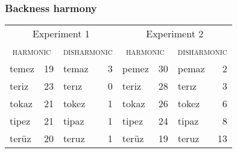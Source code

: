 





\subsubsection{Backness harmony}

\begin{example}
\begin{tabular}{lrlr|lrlr}
\toprule
\multicolumn{4}{c|}{Experiment 1} & \multicolumn{4}{c}{Experiment 2} \\
\multicolumn{2}{c}{\textsc{harmonic}} & \multicolumn{2}{c|}{\textsc{disharmonic}} & \multicolumn{2}{c}{\textsc{harmonic}} & \multicolumn{2}{c}{\textsc{disharmonic}} \\
\midrule
{temez} & 19            & {temaz} & 3 & {pemez} & 30            & {pemaz} & 2 \\
{teriz} & 23            & {terız} & 0 & {teriz} & 28            & {terız} & 3 \\
{tokaz} & 21            & {tokez} & 1 & {tokaz} & 26            & {tokez} & 6 \\
{tipez} & 21            & {tipaz} & 1 & {tipez} & 24            & {tipaz} & 8 \\
{terüz} & 20            & {teruz} & 1 & {terüz} & 19            & {teruz} & 13 \\
\bottomrule
\end{tabular}
\end{example}

